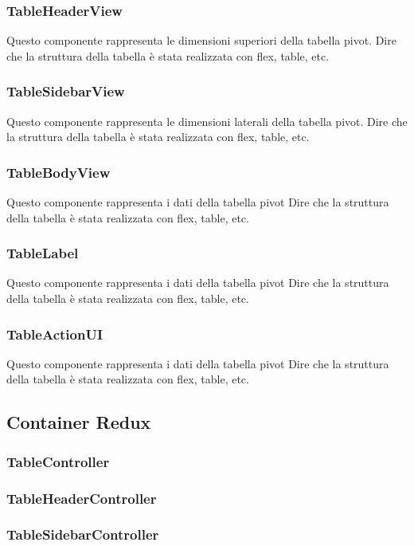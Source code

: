 \subsubsection{TableHeaderView}
Questo componente rappresenta le dimensioni superiori della tabella pivot.
Dire che la struttura della tabella è stata realizzata con flex, table, etc.

\subsubsection{TableSidebarView}
Questo componente rappresenta le dimensioni laterali della tabella pivot.
Dire che la struttura della tabella è stata realizzata con flex, table, etc.

\subsubsection{TableBodyView}
Questo componente rappresenta i dati della tabella pivot
Dire che la struttura della tabella è stata realizzata con flex, table, etc.

\subsubsection{TableLabel}
Questo componente rappresenta i dati della tabella pivot
Dire che la struttura della tabella è stata realizzata con flex, table, etc.

\subsubsection{TableActionUI}
Questo componente rappresenta i dati della tabella pivot
Dire che la struttura della tabella è stata realizzata con flex, table, etc.

\subsection{Container Redux}
\subsubsection{TableController}
\subsubsection{TableHeaderController}
\subsubsection{TableSidebarController}
